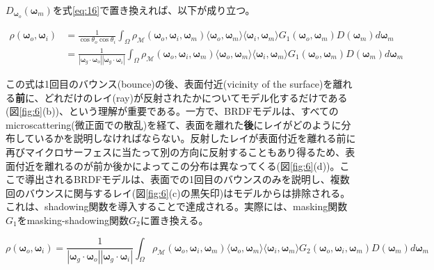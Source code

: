 \documentclass[a4j,xelatex,ja=standard]{bxjsarticle}
\begin{document}
$D_{\boldsymbol{\omega}_o}(\boldsymbol{\omega}_m)$を式\eqref{eq:16}で置き換えれば、以下が成り立つ。

\begin{equation}
    \begin{split}
        \rho(\boldsymbol{\omega}_o, \boldsymbol{\omega}_i)
        &= \frac{1}{\cos\theta_o \cos\theta_i} \int_{\Omega} \rho_{\mathcal M}(\boldsymbol{\omega}_o, \boldsymbol{\omega}_i, \boldsymbol{\omega}_m) \langle \boldsymbol{\omega}_o, \boldsymbol{\omega}_m \rangle \langle \boldsymbol{\omega}_i, \boldsymbol{\omega}_m \rangle G_1(\boldsymbol{\omega}_o, \boldsymbol{\omega}_m) D(\boldsymbol{\omega}_m) d\boldsymbol{\omega}_m \\
        &= \frac{1}{|\boldsymbol{\omega}_g \cdot \boldsymbol{\omega}_o| |\boldsymbol{\omega}_g \cdot \boldsymbol{\omega}_i|} \int_{\Omega} \rho_{\mathcal M}(\boldsymbol{\omega}_o, \boldsymbol{\omega}_i, \boldsymbol{\omega}_m) \langle \boldsymbol{\omega}_o, \boldsymbol{\omega}_m \rangle \langle \boldsymbol{\omega}_i, \boldsymbol{\omega}_m \rangle G_1(\boldsymbol{\omega}_o, \boldsymbol{\omega}_m) D(\boldsymbol{\omega}_m) d\boldsymbol{\omega}_m
    \end{split}
    \label{eq:25}
\end{equation}

この式は1回目のバウンス(bounce)の後、表面付近(vicinity of the surface)を離れる\textbf{前}に、どれだけのレイ(ray)が反射されたかについてモデル化するだけである(図\ref{fig:6}(b))、という理解が重要である。一方で、BRDFモデルは、すべてのmicroscattering(微正面での散乱)を経て、表面を離れた\textbf{後}にレイがどのように分布しているかを説明しなければならない。反射したレイが表面付近を離れる前に再びマイクロサーフェスに当たって別の方向に反射することもあり得るため、表面付近を離れるのが前か後かによってこの分布は異なってくる(図\ref{fig:6}(d))。ここで導出されるBRDFモデルは、表面での1回目のバウンスのみを説明し、複数回のバウンスに関与するレイ(図\ref{fig:6}(c)の黒矢印)はモデルからは排除される。これは、shadowing関数を導入することで達成される。実際には、masking関数$G_1$をmasking-shadowing関数$G_2$に置き換える。

\begin{equation}
    \rho(\boldsymbol{\omega}_o, \boldsymbol{\omega}_i) = \frac{1}{|\boldsymbol{\omega}_g \cdot \boldsymbol{\omega}_o| |\boldsymbol{\omega}_g \cdot \boldsymbol{\omega}_i|} \int_{\Omega} \rho_{\mathcal M}(\boldsymbol{\omega}_o, \boldsymbol{\omega}_i, \boldsymbol{\omega}_m) \langle \boldsymbol{\omega}_o, \boldsymbol{\omega}_m \rangle \langle \boldsymbol{\omega}_i, \boldsymbol{\omega}_m \rangle G_2(\boldsymbol{\omega}_o, \boldsymbol{\omega}_i, \boldsymbol{\omega}_m) D(\boldsymbol{\omega}_m) d\boldsymbol{\omega}_m
    \label{eq:26}
\end{equation}
\end{document}
